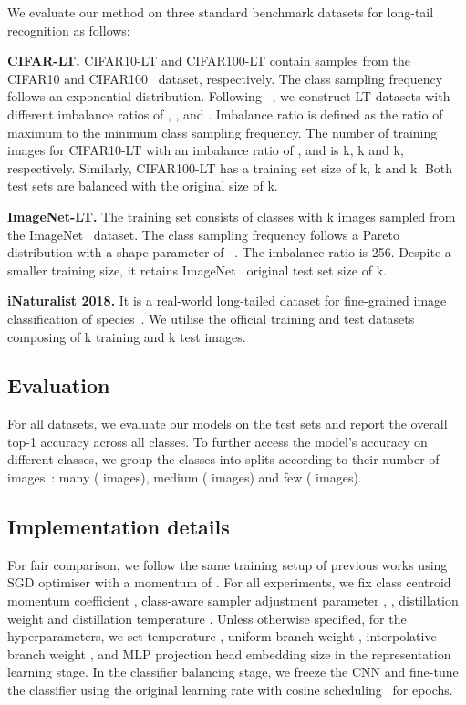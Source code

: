 We evaluate our method on three standard benchmark datasets for long-tail recognition as follows:

\textbf{CIFAR-LT.} 
CIFAR10-LT and CIFAR100-LT contain samples from the CIFAR10 and CIFAR100~\cite{cifar} dataset, respectively.
The class sampling frequency follows an exponential distribution.
Following ~\cite{bbn, ldam}, we construct LT datasets with different imbalance ratios of , , and .
Imbalance ratio is defined as the ratio of maximum to the minimum class sampling frequency. The number of training images for CIFAR10-LT with an imbalance ratio of ,  and  is k, k and k, respectively. Similarly, CIFAR100-LT has a training set size of k, k and k. Both test sets are balanced with the original size of k.

\textbf{ImageNet-LT.} The training set consists of  classes with k images sampled from the ImageNet~\cite{ImageNet} dataset.
The class sampling frequency follows a Pareto distribution with a shape parameter of ~\cite{oltr}. 
The imbalance ratio is 256.
Despite a smaller training size, it retains ImageNet~\cite{ImageNet} original test set size of k. 

\textbf{iNaturalist 2018.} It is a real-world long-tailed dataset for fine-grained image classification of  species~\cite{inat18}. We utilise the official training and test datasets composing of k training and k test images.  

\subsection{Evaluation}
For all datasets, we evaluate our models on the test sets and report the overall top-1 accuracy across all classes. 
To further access the model's accuracy on different classes, we group the classes into splits according to their number of images~\cite{oltr, decouple-longtail}: many ( images), medium ( images) and few ( images). 

\subsection{Implementation details}
For fair comparison, we follow the same training setup of previous works using SGD optimiser with a momentum of . 
For all experiments, we fix class centroid momentum coefficient , class-aware sampler adjustment parameter , , distillation weight  and distillation temperature . 
Unless otherwise specified, for the hyperparameters, we set temperature , uniform branch weight , interpolative branch weight , and MLP projection head embedding size  in the representation learning stage. 
In the classifier balancing stage, we freeze the CNN and fine-tune the classifier using the original learning rate with cosine scheduling~\cite{loshchilov2016sgdr} for  epochs.



